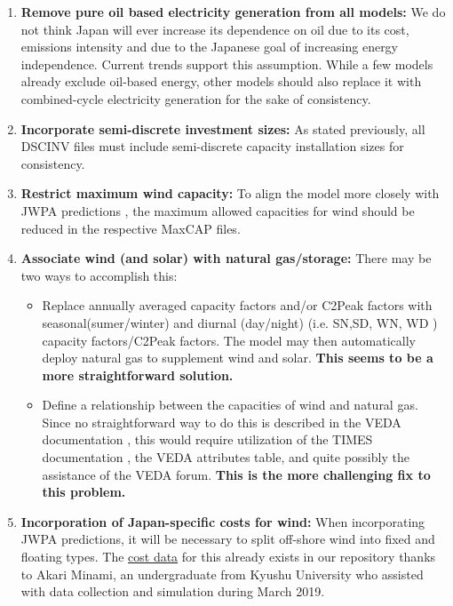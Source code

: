\documentclass[14pt,a4paper]{article} %
\begin{document}
\begin{enumerate}

\item \textbf{Remove pure oil based electricity generation from all models:} We do not think Japan will ever increase its dependence on oil due to its cost, emissions intensity and due to the Japanese goal of increasing energy independence. Current trends support this assumption. While a few models already exclude oil-based energy, other models should also replace it with combined-cycle electricity generation for the sake of consistency.

\item \textbf{Incorporate semi-discrete investment sizes:} As stated previously, all DSCINV files must include semi-discrete capacity installation sizes for consistency.

\item \textbf{Restrict maximum wind capacity:} To align the model more closely with JWPA predictions \cite{heger_wind_2016}, the maximum allowed capacities for wind should be reduced in the respective MaxCAP files.

\item \textbf{Associate wind (and solar) with natural gas/storage:} There may be two ways to accomplish this:

\begin{itemize}

\item Replace annually averaged capacity factors and/or C2Peak factors with seasonal(sumer/winter) and diurnal (day/night) (i.e. SN,SD, WN, WD \cite{gargiulo_documentation_2005} ) capacity factors/C2Peak factors. The model may then automatically deploy natural gas to supplement wind and solar. \textbf{This seems to be a more straightforward solution.}

\item Define a relationship between the capacities of wind and natural gas. Since no straightforward way to do this is described in the VEDA documentation \cite{gargiulo_documentation_2005}, this would require utilization of the TIMES documentation \cite{loulou_documentation_2005}, the VEDA attributes table, and quite possibly the assistance of the VEDA forum. \textbf{This is the more challenging fix to this problem.}

\end{itemize}

\item \textbf{Incorporation of Japan-specific costs for wind:} When incorporating JWPA predictions, it will be necessary to split off-shore wind into fixed and floating types. The \href{https://github.com/arfc/i2cner/tree/master/data/japan_costs}{cost data} for this already exists in our repository thanks to Akari Minami, an undergraduate from Kyushu University who assisted with data collection and simulation during March 2019.


\end{enumerate}
\end{document}
